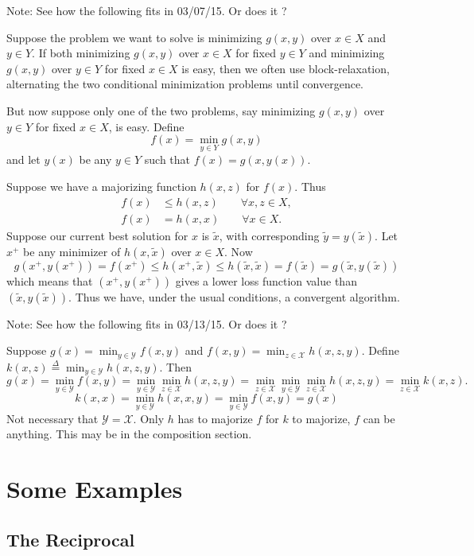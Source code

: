 \documentclass[
  12pt,
]{book}
\begin{document}
Note: See how the following fits in 03/07/15. Or does it ?

Suppose the problem we want to solve is minimizing \(g(x,y)\) over \(x\in X\)
and \(y\in Y\). If both minimizing \(g(x,y)\) over \(x\in X\) for fixed \(y\in Y\)
and minimizing \(g(x,y)\) over \(y\in Y\) for fixed \(x\in X\) is easy, then we
often use block-relaxation, alternating the two conditional minimization
problems until convergence.

But now suppose only one of the two problems, say
minimizing \(g(x,y)\) over \(y\in Y\) for fixed \(x\in X\), is easy. Define
\[
f(x)=\min_{y\in Y} g(x,y)
\]
and let \(y(x)\) be any \(y\in Y\) such that \(f(x)=g(x,y(x))\).

Suppose we have a majorizing function \(h(x,z)\) for \(f(x)\). Thus
\begin{align*}
f(x)&\leq h(x,z)\qquad\forall x,z\in X,\\
f(x)&= h(x,x)\qquad\forall x\in X.
\end{align*}
Suppose our current best solution for \(x\) is \(\tilde x\), with corresponding \(\tilde y=y(\tilde x)\). Let \(x^+\) be any minimizer of \(h(x,\tilde x)\) over \(x\in X\). Now
\[
g(x^+,y(x^+))=f(x^+)\leq h(x^+,\tilde x)\leq h(\tilde x,\tilde x)=f(\tilde x)=g(\tilde x,y(\tilde x))
\]
which means that \((x^+,y(x^+))\) gives a lower loss function value than \((\tilde x,y(\tilde x))\). Thus we have, under the usual conditions, a convergent algorithm.

Note: See how the following fits in 03/13/15. Or does it ?

Suppose \(g(x)=\min_{y\in\mathcal{Y}}f(x,y)\) and \(f(x,y)=\min_{z\in\mathcal{X}}h(x,z,y)\). Define \(k(x,z)\mathop{=}\limits^{\Delta}\min_{y\in\mathcal{Y}}h(x,z,y)\). Then
\[
g(x)=\min_{y\in\mathcal{Y}} f(x,y)=\min_{y\in\mathcal{Y}}\min_{z\in\mathcal{X}}h(x,z,y)=\min_{z\in\mathcal{X}}\min_{y\in\mathcal{Y}}\min_{z\in\mathcal{X}}h(x,z,y)=\min_{z\in\mathcal{X}}k(x,z).
\]
\[
k(x,x)=\min_{y\in\mathcal{Y}}h(x,x,y)=\min_{y\in\mathcal{Y}}f(x,y)=g(x)
\]
Not necessary that \(\mathcal{Y}=\mathcal{X}\). Only \(h\) has to majorize \(f\) for \(k\) to majorize, \(f\) can be anything. This may be in the composition section.

\hypertarget{some-examples}{%
\section{Some Examples}\label{some-examples}}

\hypertarget{the-reciprocal}{%
\subsection{The Reciprocal}\label{the-reciprocal}}
\end{document}
